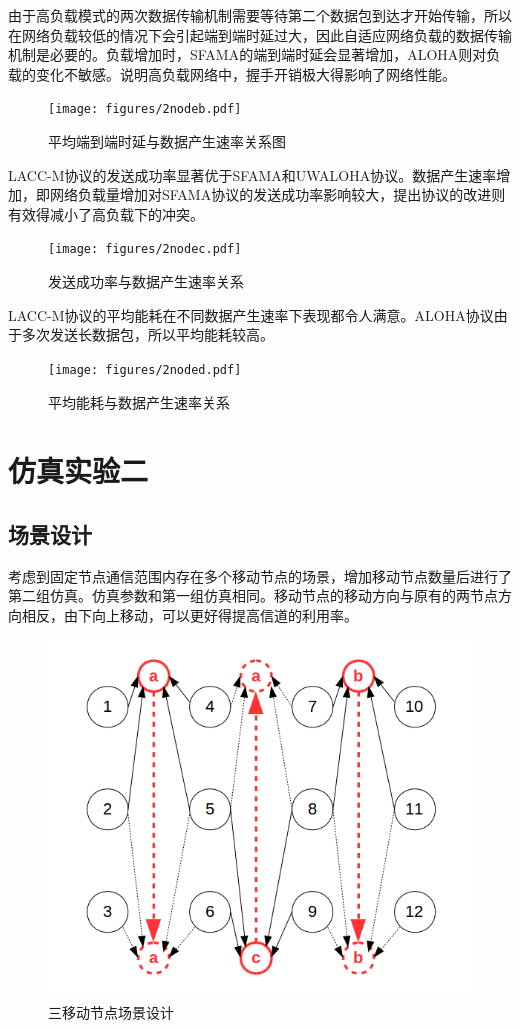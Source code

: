 由于高负载模式的两次数据传输机制需要等待第二个数据包到达才开始传输，所以在网络负载较低的情况下会引起端到端时延过大，因此自适应网络负载的数据传输机制是必要的。负载增加时，SFAMA的端到端时延会显著增加，ALOHA则对负载的变化不敏感。说明高负载网络中，握手开销极大得影响了网络性能。
\begin{figure}[!ht]
	\centering
	\texttt{[image: figures/2nodeb.pdf]}
	\caption{
		平均端到端时延与数据产生速率关系图
	}
	\label{fig:example}
\end{figure}

LACC-M协议的发送成功率显著优于SFAMA和UWALOHA协议。数据产生速率增加，即网络负载量增加对SFAMA协议的发送成功率影响较大，提出协议的改进则有效得减小了高负载下的冲突。
\begin{figure}[!ht]
	\centering
	\texttt{[image: figures/2nodec.pdf]}
	\caption{
		发送成功率与数据产生速率关系
	}
	\label{fig:example}
\end{figure}

LACC-M协议的平均能耗在不同数据产生速率下表现都令人满意。ALOHA协议由于多次发送长数据包，所以平均能耗较高。

\begin{figure}[!ht]
	\centering
	\texttt{[image: figures/2noded.pdf]}
	\caption{
		平均能耗与数据产生速率关系
	}
	\label{fig:example}
\end{figure}

\section {仿真实验二}
\subsection{场景设计}
考虑到固定节点通信范围内存在多个移动节点的场景，增加移动节点数量后进行了第二组仿真。仿真参数和第一组仿真相同。移动节点的移动方向与原有的两节点方向相反，由下向上移动，可以更好得提高信道的利用率。

\begin{figure}[!ht]
	\centering
	\includegraphics[scale=0.52]{figures/3scen.png}
	\caption{
		三移动节点场景设计
	}
	\label{fig:example}
\end{figure}


